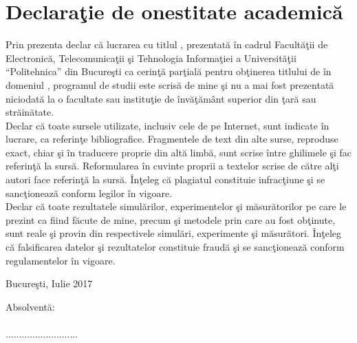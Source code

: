 \chapter*{\centering Declaraţie de onestitate academică}
\thispagestyle{empty}
\vspace{15mm}

    Prin prezenta declar că lucrarea cu titlul \textit{\VARtitlero}, prezentată
    în cadrul Facultăţii de Electronică, Telecomunicaţii şi Tehnologia
    Informaţiei a Universităţii “Politehnica” din Bucureşti ca cerinţă parţială
    pentru obţinerea titlului de \textit{\VARtitludom} în domeniul
    \textit{\VARdomeniu}, programul de studii \textit{\VARprogram} este scrisă
    de mine şi nu a mai fost prezentată niciodată la o facultate sau instituţie
    de învăţământ superior din ţară sau străinătate.  \\
    
    Declar că toate sursele utilizate,
    inclusiv cele de pe Internet, sunt indicate în lucrare, ca referinţe
    bibliografice. Fragmentele de text din alte surse, reproduse exact, chiar şi
    în traducere proprie din altă limbă, sunt scrise între ghilimele şi fac
    referinţă la sursă. Reformularea în cuvinte proprii a textelor scrise de
    către alţi autori face referinţă la sursă. Înţeleg că plagiatul constituie
    infracţiune şi se sancţionează conform legilor în vigoare. \\
    
    Declar că toate
    rezultatele simulărilor, experimentelor şi măsurătorilor pe care le prezint
    ca fiind făcute de mine, precum şi metodele prin care au fost obţinute, sunt
    reale şi provin din respectivele simulări, experimente şi măsurători.
    Înţeleg că falsificarea datelor şi rezultatelor constituie fraudă şi se
    sancţionează conform regulamentelor în vigoare.

\vfill
Bucureşti, Iulie 2017 

Absolventă: \VARauthor
\\
\\

...........................

\vfill\newpage
